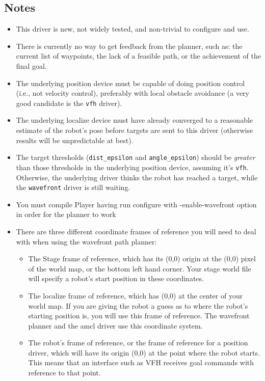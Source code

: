 \subsection*{Notes}
\begin{itemize}
\item This driver is new, not widely tested, and non-trivial to configure
and use.
\item There is currently no way to get feedback from the planner, such as:
the current list of waypoints, the lack of a feasible path, or the
achievement of the final goal.
\item The underlying position device must be capable of doing position
control (i.e., not velocity control), preferably with local obstacle
avoidance (a very good candidate is the {\tt vfh} driver).
\item The underlying localize device must have already converged to a
reasonable estimate of the robot's pose before targets are sent to this
driver (otherwise results will be unpredictable at best).
\item The target thresholds ({\tt dist\_epsilon} and {\tt angle\_epsilon})
should be {\em greater} than those thresholds in the underlying position
device, assuming it's {\tt vfh}.  Otherwise, the underlying driver thinks
the robot has reached a target, while the {\tt wavefront} driver is still
waiting.
\item You must compile Player having run configure with \--enable-wavefront option in order for the planner to work
\item There are three different coordinate frames of reference you will need to deal with when using the wavefront path planner:
\begin{itemize}
\item The Stage frame of reference, which has its (0,0) origin at the (0,0) pixel of the world map, or the bottom left hand corner. Your stage world file will specify a robot's start position in these coordinates.
\item The localize frame of reference, which has (0,0) at the center of your world map. If you are giving the robot a guess as to where the robot's starting position is, you will use this frame of reference. The wavefront planner and the amcl driver use this coordinate system.
\item The robot's frame of reference, or the frame of reference for a position driver, which will have its origin (0,0) at the point where the robot starts. This means that an interface such as VFH receives goal commands with reference to that point.
\end{itemize}
\end{itemize}


